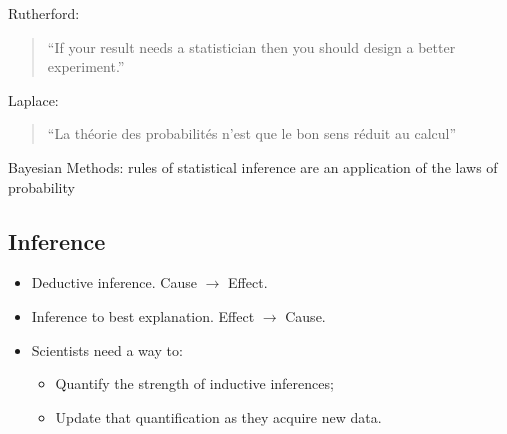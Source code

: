 \documentclass[%
oneside,                 %
final,                   %
10pt]{article}
\newenvironment{block_mdfboxadmon}[1][]{
\begin{block_mdfboxmdframed}[frametitle=#1]
}
{
\end{block_mdfboxmdframed}
}
\begin{document}


\begin{block_mdfboxadmon}[]
Rutherford:

\begin{quote}
“If your result needs a statistician then you should design a better experiment.”
\end{quote}
\end{block_mdfboxadmon} %




\begin{block_mdfboxadmon}[]
Laplace:

\begin{quote}
“La théorie des probabilités n'est que le bon sens réduit au calcul”
\end{quote}
\end{block_mdfboxadmon} %



Bayesian Methods: rules of statistical inference are an application of the laws of probability


\subsection{Inference}

\begin{block_mdfboxadmon}[]
\begin{itemize}
 \item Deductive inference. Cause $\to$ Effect. 

 \item Inference to best explanation. Effect $\to$ Cause. 

 \item Scientists need a way to:
\begin{itemize}

    \item Quantify the strength of inductive inferences;

    \item Update that quantification as they acquire new data.
\end{itemize}

\noindent
\end{itemize}

\noindent
\end{block_mdfboxadmon} %
\end{document}
